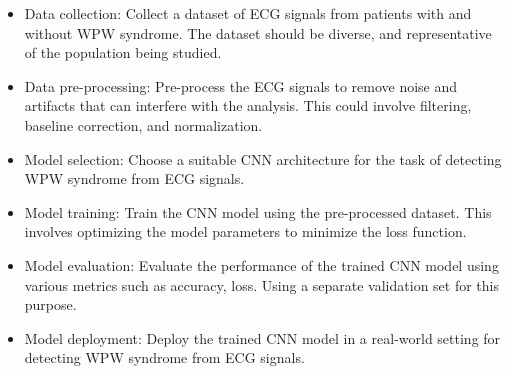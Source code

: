 \begin{itemize}
	\item Data collection: Collect a dataset of ECG signals from patients with and without WPW syndrome. The dataset should be diverse, and representative of the population being studied.  
	\item Data pre-processing: Pre-process the ECG signals to remove noise and artifacts that can interfere with the analysis. This could involve filtering, baseline correction, and normalization. 
	\item Model selection: Choose a suitable CNN architecture for the task of detecting WPW syndrome from ECG signals.  
	\item Model training: Train the CNN model using the pre-processed dataset. This involves optimizing the model parameters to minimize the loss function.  
	\item Model evaluation: Evaluate the performance of the trained CNN model using various metrics such as accuracy, loss. Using a separate validation set for this purpose.  
	\item Model deployment: Deploy the trained CNN model in a real-world setting for detecting WPW syndrome from ECG signals.  
\end{itemize}

